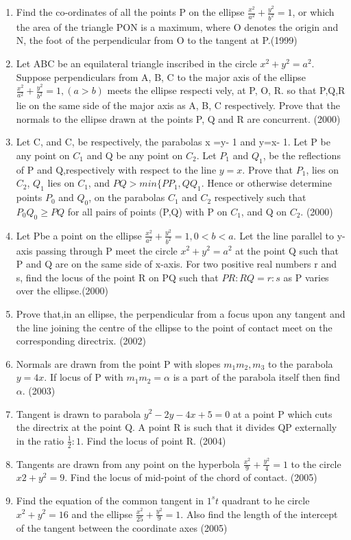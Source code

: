 \documentclass[12pt]{article}
\begin{document}
\begin{enumerate}
\item Find the co-ordinates of all the points P on the ellipse $\frac{x^2}{a^2}+\frac{y^2}{b^2}=1$, or which the area of the triangle PON is a maximum, where O denotes the origin and N, the foot of the perpendicular from O to the tangent at P.(1999)
\item Let ABC be an equilateral triangle inscribed in the circle $x^2+y^2=a^2$. Suppose perpendiculars from A, B, C to the major axis of the ellipse $\frac{x^2}{a^2}+\frac{y^2}{b^2}=1,(a> b)$ meets the ellipse respecti vely, at P, O, R. so that P,Q,R lie on the same side of the major axis as A, B, C respectively. Prove that the normals to the ellipse drawn at the points P, Q and R are concurrent. (2000)
\item Let C, and C, be respectively, the parabolas x =y- 1 and y=x- 1. Let P be any point on $C_1$ and Q be any point on $C_2$. Let $P_1$  and $Q_1$, be the reflections of P and Q,respectively with respect to the line $y=x$. Prove that $P_1$, lies on $C_2$, $Q_1$ lies on $C_1$, and $PQ> min\{ PP_1,QQ_1$. Hence or otherwise determine points $P_0$ and $Q_0$, on the parabolas $C_1$ and $C_2$ respectively such that $P_0Q_0\geq PQ$  for all pairs of points (P,Q) with P on $C_1$, and Q on $C_2$. (2000)
\item Let Pbe a point on the ellipse $\frac{x^2}{a^2}+\frac{y^2}{b^2}=1,0<b<a$. Let the line parallel to y-axis passing through P meet the circle $x^2+y^2=a^2$ at the point Q such that P and Q are on the same side of x-axis. For two positive real numbers r and s, find the locus of the point R on PQ such that $PR:RQ=r:s$ as P varies over the ellipse.(2000)
\item Prove that,in an ellipse, the perpendicular from a focus upon any tangent and the line joining the centre of the ellipse to the point of contact meet on the corresponding directrix. (2002)
\item Normals are drawn from the point P with slopes $m_1m_2,m_3$ to the parabola $y= 4x$. If locus of P with $m_1m_2=\alpha$ is a part of the parabola itself then find $\alpha$. (2003)
\item Tangent is drawn to parabola $y^2-2y-4x+5=0$ at a point P which cuts the directrix at the point Q. A point R is such that it divides QP externally in the ratio $\frac{1}{2}:1$. Find the locus of point R. (2004)
\item Tangents are drawn from any point on the hyperbola $\frac{x^2}{9}+\frac{y^2}{4}=1$ to the circle $x2+y^2 =9$. Find the locus of mid-point of the chord of contact. (2005)
\item Find the equation of the common tangent in $1^st$ quadrant to he circle $x^2+y^2=16$ and the ellipse $\frac{x^2}{25}+\frac{y^2}{9}=1$. Also find the length of the intercept of the tangent between the coordinate axes (2005)
\end{enumerate}
\end{document}

